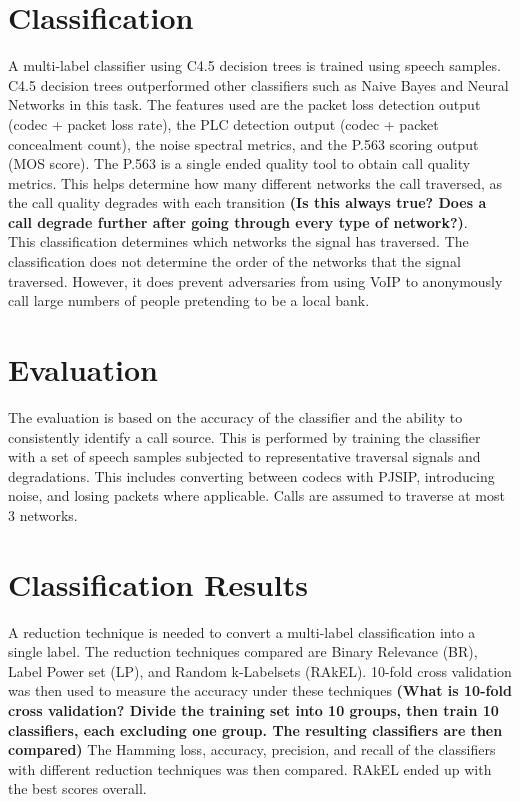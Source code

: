 \documentclass{article}
\begin{document}
\section{Classification}
A multi-label classifier using C4.5 decision trees is trained using speech samples.
C4.5 decision trees outperformed other classifiers such as Naive Bayes and Neural Networks in this task.
The features used are the packet loss detection output (codec + packet loss rate),
the PLC detection output (codec + packet concealment count),
the noise spectral metrics, and the P.563 scoring output (MOS score).
The P.563 is a single ended quality tool to obtain call quality metrics.
This helps determine how many different networks the call traversed,
as the call quality degrades with each transition
{\bf(Is this always true? Does a call degrade further after going through every type of network?)}.\\
This classification determines which networks the signal has traversed.
The classification does not determine the order of the networks that the signal traversed.
However, it does prevent adversaries from using VoIP to anonymously call large numbers of people pretending to be a local bank.
\section{Evaluation}
The evaluation is based on the accuracy of the classifier and the ability to consistently identify a call source.
This is performed by training the classifier with a set of speech samples subjected to representative traversal signals and degradations.
This includes converting between codecs with PJSIP, introducing noise, and losing packets where applicable.
Calls are assumed to traverse at most 3 networks.
\section{Classification Results}
A reduction technique is needed to convert a multi-label classification into a single label.
The reduction techniques compared are Binary Relevance (BR), Label Power set (LP), and Random k-Labelsets (RAkEL).
10-fold cross validation was then used to measure the accuracy under these techniques
{\bf(What is 10-fold cross validation?
  Divide the training set into 10 groups, then train 10 classifiers, each excluding one group.
  The resulting classifiers are then compared)}
The Hamming loss, accuracy, precision, and recall
of the classifiers with different reduction techniques was then compared.
RAkEL ended up with the best scores overall.
\end{document}

